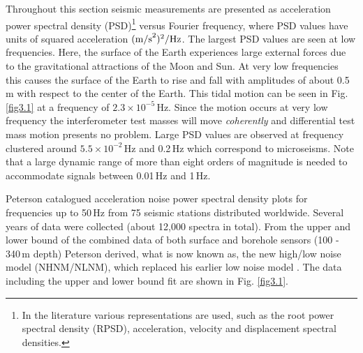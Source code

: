 Throughout this section seismic measurements are presented as acceleration power spectral density (PSD)\footnote{In the literature various representations are used, such as the root power spectral density (RPSD), acceleration, velocity and displacement spectral densities.} versus Fourier frequency, where PSD values have units of squared acceleration $({\rm m/s}^2)^2/{\rm Hz}$. The largest PSD values are seen at low frequencies. Here, the surface of the Earth experiences large external forces due to the gravitational attractions of the Moon and Sun. At very low frequencies this causes the surface of the Earth to rise and fall with amplitudes of about 0.5\,m with respect to the center of the Earth. This tidal motion can be seen in Fig. \ref{fig3.1} at a frequency of $2.3 \times 10^{-5}$\,Hz. Since the motion occurs at very low frequency the interferometer test masses will move {\sl coherently} and differential test mass motion presents no problem. Large PSD values are observed at frequency clustered around $5.5 \times 10^{-2}$\,Hz and 0.2\,Hz which correspond to microseisms. Note that a large dynamic range of more than eight orders of magnitude is needed to accommodate signals between 0.01\,Hz and 1\,Hz.

Peterson \cite{Peterson1993} catalogued acceleration noise power spectral density plots for frequencies up to 50\,Hz from 75 seismic stations distributed worldwide. Several years of data were collected (about 12,000 spectra in total). From the upper and lower bound of the combined data of both surface and borehole sensors (100 - 340\,m depth) Peterson derived, what is now known as, the new high/low noise model (NHNM/NLNM), which replaced his earlier low noise model \cite{Peterson1980}. The data including the upper and lower bound fit are shown in Fig. \ref{fig3.1}. 


